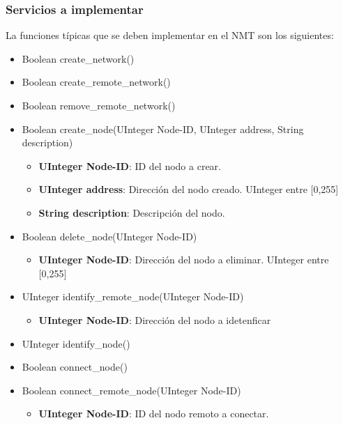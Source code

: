 \subsubsection{Servicios a implementar}\label{subsubsection_servicios_implementar}
La funciones típicas que se deben implementar en el NMT son los siguientes:
\begin{itemize}
\item Boolean create\_network()
\item Boolean create\_remote\_network() 
\item Boolean remove\_remote\_network()
\item Boolean create\_node(UInteger Node-ID, UInteger address, String description)
  \begin{itemize}
  \item \textbf{UInteger Node-ID}: ID del nodo a crear.
  \item \textbf{UInteger address}: Dirección del nodo creado. UInteger entre [0,255]
  \item \textbf{String description}: Descripción del nodo.
  \end{itemize}
\item Boolean delete\_node(UInteger Node-ID)
  \begin{itemize}
   \item \textbf{UInteger Node-ID}: Dirección del nodo a eliminar. UInteger entre [0,255]
  \end{itemize}
    
\item UInteger identify\_remote\_node(UInteger Node-ID)
  \begin{itemize}
  \item \textbf{UInteger Node-ID}: Dirección del nodo a idetenficar
  \end{itemize}

\item UInteger identify\_node()
  
\item Boolean connect\_node()
  
\item Boolean connect\_remote\_node(UInteger Node-ID)
  \begin{itemize}
    \item \textbf{UInteger Node-ID}: ID del nodo remoto a conectar.
  \end{itemize}


\end{itemize}
